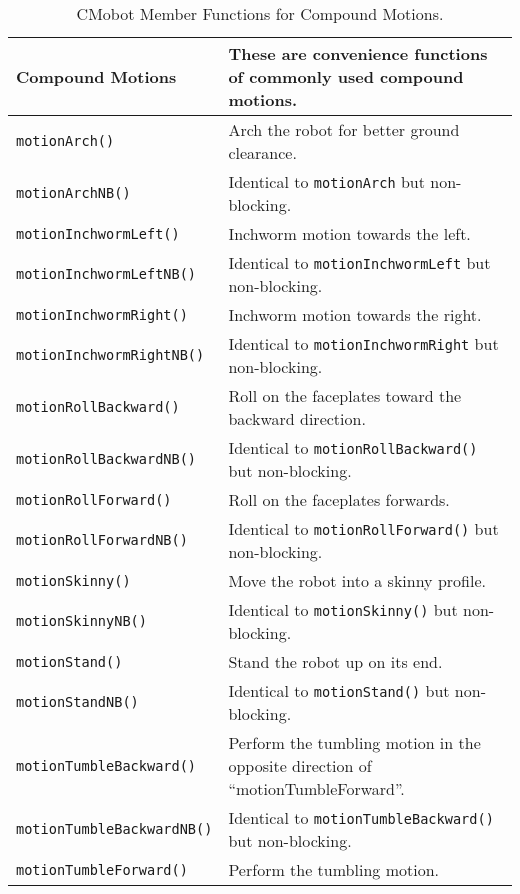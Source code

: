 \begin{table}[!h]
\begin{center}
\caption{CMobot Member Functions for Compound Motions.}
\begin{tabular}{p{38 mm}p{107 mm}}
Compound Motions & These are convenience functions of commonly used compound motions. \\
\hline
\texttt{motionArch()} \dotfill & Arch the robot for better ground clearance. \\
\texttt{motionArchNB()} \dotfill & Identical to \texttt{motionArch} but non-blocking. \\
\texttt{motionInchwormLeft()} \dotfill & Inchworm motion towards the left. \\
\texttt{motionInchwormLeftNB()} \dotfill & Identical to \texttt{motionInchwormLeft} but non-blocking. \\
\texttt{motionInchwormRight()} \dotfill & Inchworm motion towards the right. \\
\texttt{motionInchwormRightNB()} \dotfill & Identical to \texttt{motionInchwormRight} but non-blocking. \\
\texttt{motionRollBackward()} \dotfill & Roll on the faceplates toward the backward direction. \\
\texttt{motionRollBackwardNB()} \dotfill & Identical to \texttt{motionRollBackward()} but non-blocking. \\
\texttt{motionRollForward()} \dotfill & Roll on the faceplates forwards. \\
\texttt{motionRollForwardNB()} \dotfill & Identical to \texttt{motionRollForward()} but non-blocking. \\
\texttt{motionSkinny()} \dotfill & Move the robot into a skinny profile. \\
\texttt{motionSkinnyNB()} \dotfill & Identical to \texttt{motionSkinny()} but non-blocking. \\
\texttt{motionStand()} \dotfill & Stand the robot up on its end. \\
\texttt{motionStandNB()} \dotfill & Identical to \texttt{motionStand()} but non-blocking. \\
\texttt{motionTumbleBackward()} \dotfill & Perform the tumbling motion in the opposite direction of ``motionTumbleForward''. \\
\texttt{motionTumbleBackwardNB()} \dotfill & Identical to \texttt{motionTumbleBackward()} but non-blocking. \\
\texttt{motionTumbleForward()} \dotfill & Perform the tumbling motion. \\

\end{tabular}
\end{center}
\end{table}
